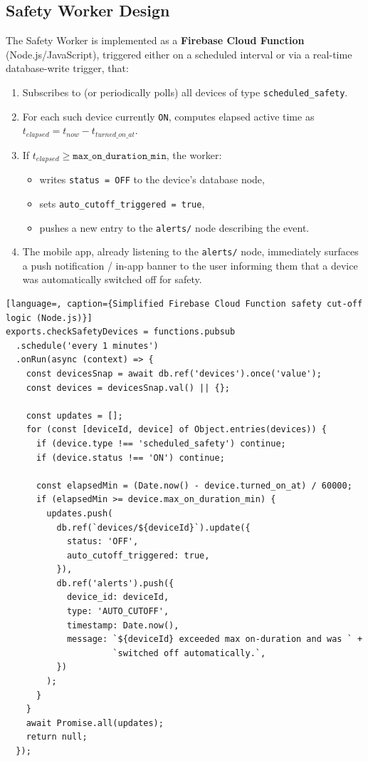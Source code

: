 \documentclass[11pt,a4paper]{article}
\begin{document}
\subsection{Safety Worker Design}
The Safety Worker is implemented as a \textbf{Firebase Cloud Function} (Node.js/JavaScript), triggered either on a scheduled interval or via a real-time database-write trigger, that:

\begin{enumerate}
    \item Subscribes to (or periodically polls) all devices of type \texttt{scheduled\_safety}.
    \item For each such device currently \texttt{ON}, computes elapsed active time as $t_{elapsed} = t_{now} - t_{turned\_on\_at}$.
    \item If $t_{elapsed} \geq \texttt{max\_on\_duration\_min}$, the worker:
    \begin{itemize}
        \item writes \texttt{status = OFF} to the device's database node,
        \item sets \texttt{auto\_cutoff\_triggered = true},
        \item pushes a new entry to the \texttt{alerts/} node describing the event.
    \end{itemize}
    \item The mobile app, already listening to the \texttt{alerts/} node, immediately surfaces a push notification / in-app banner to the user informing them that a device was automatically switched off for safety.
\end{enumerate}

\begin{lstlisting}[language=, caption={Simplified Firebase Cloud Function safety cut-off logic (Node.js)}]
exports.checkSafetyDevices = functions.pubsub
  .schedule('every 1 minutes')
  .onRun(async (context) => {
    const devicesSnap = await db.ref('devices').once('value');
    const devices = devicesSnap.val() || {};

    const updates = [];
    for (const [deviceId, device] of Object.entries(devices)) {
      if (device.type !== 'scheduled_safety') continue;
      if (device.status !== 'ON') continue;

      const elapsedMin = (Date.now() - device.turned_on_at) / 60000;
      if (elapsedMin >= device.max_on_duration_min) {
        updates.push(
          db.ref(`devices/${deviceId}`).update({
            status: 'OFF',
            auto_cutoff_triggered: true,
          }),
          db.ref('alerts').push({
            device_id: deviceId,
            type: 'AUTO_CUTOFF',
            timestamp: Date.now(),
            message: `${deviceId} exceeded max on-duration and was ` +
                     `switched off automatically.`,
          })
        );
      }
    }
    await Promise.all(updates);
    return null;
  });
\end{lstlisting}
\end{document}
